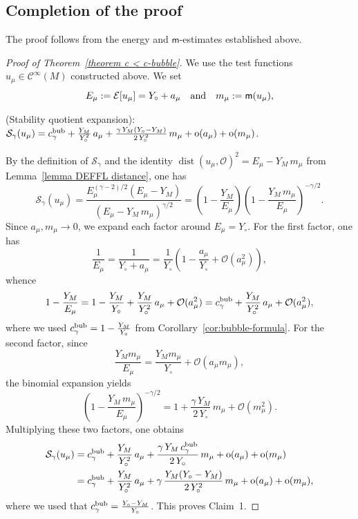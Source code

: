 \documentclass[reqno,11pt]{amsart}
\numberwithin{equation}{section}
\theoremstyle{definition}
\theoremstyle{remark}
\DeclareMathOperator{\dist}{dist}
\begin{document}
\subsection{Completion of the proof}

The proof follows from the energy and $\mathsf{m}$-estimates established above.

\begin{proof}[Proof of Theorem~\ref{theorem c < c-bubble}]
We use the test functions $u_\mu\in \mathcal{C}^\infty(M)$ constructed above. We set
\[
E_\mu := \mathcal{E}[u_\mu] = Y_\circ + a_\mu \quad {\rm and} \quad m_\mu := \mathsf{m}(u_\mu),
\]

\medskip
{} {\rm (Stability quotient expansion):} {\it $\mathcal{S}_\gamma(u_\mu) = c_\gamma^{\rm bub} + \frac{Y_M}{Y_\circ^2}\, a_\mu + \frac{\gamma\, Y_M(Y_\circ - Y_M)}{2\, Y_\circ^2}\, m_\mu + \mathrm{o}(a_\mu) + \mathrm{o}(m_\mu)$.}

\smallskip
{} By the definition of $\mathcal{S}_\gamma$ and the identity $\dist(u_\mu, \mathscr{O})^2 = E_\mu - Y_M\, m_\mu$ from Lemma~\ref{lemma DEFFL distance}, one has
\begin{equation}\label{eq:S-expansion}
\mathcal{S}_\gamma(u_\mu) = \frac{E_\mu^{(\gamma-2)/2}(E_\mu - Y_M)}{(E_\mu - Y_M\, m_\mu)^{\gamma/2}}
= \left(1 - \frac{Y_M}{E_\mu}\right)\left(1 - \frac{Y_M\, m_\mu}{E_\mu}\right)^{-\gamma/2}.
\end{equation}
Since $a_\mu, m_\mu \to 0$, we expand each factor around $E_\mu = Y_\circ$. For the first factor, one has
\[
\frac{1}{E_\mu} = \frac{1}{Y_\circ + a_\mu} = \frac{1}{Y_\circ}\left(1 - \frac{a_\mu}{Y_\circ} + \mathcal{O}(a_\mu^2)\right),
\]
whence
\[
1 - \frac{Y_M}{E_\mu} = 1 - \frac{Y_M}{Y_\circ} + \frac{Y_M}{Y_\circ^2}\, a_\mu + \mathcal{O}(a_\mu^2) = c_\gamma^{\rm bub} + \frac{Y_M}{Y_\circ^2}\, a_\mu + \mathcal{O}(a_\mu^2),
\]
where we used $c_\gamma^{\rm bub} = 1 - \tfrac{Y_M}{Y_\circ}$ from Corollary~\ref{cor:bubble-formula}. For the second factor, since 
\[
\frac{Y_M m_\mu}{E_\mu} = \frac{Y_M m_\mu}{Y_\circ} + \mathcal{O}(a_\mu m_\mu),
\]
the binomial expansion yields
\[
\left(1 - \frac{Y_M\, m_\mu}{E_\mu}\right)^{-\gamma/2} = 1 + \frac{\gamma\, Y_M}{2\, Y_\circ}\, m_\mu + \mathcal{O}(m_\mu^2).
\]
Multiplying these two factors, one obtains
\begin{equation}\label{eq:S-expansion-final}
\begin{aligned}
\mathcal{S}_\gamma(u_\mu) &= c_\gamma^{\rm bub} + \frac{Y_M}{Y_\circ^2}\, a_\mu + \frac{\gamma\, Y_M\, c_\gamma^{\rm bub}}{2\, Y_\circ}\, m_\mu + \mathrm{o}(a_\mu) + \mathrm{o}(m_\mu)\\
&= c_\gamma^{\rm bub} + \frac{Y_M}{Y_\circ^2}\, a_\mu + \gamma\, \frac{Y_M(Y_\circ - Y_M)}{2\, Y_\circ^2}\, m_\mu + \mathrm{o}(a_\mu) + \mathrm{o}(m_\mu), 
\end{aligned}
\end{equation}
where we used that $c_\gamma^{\rm bub} = \tfrac{Y_\circ - Y_M}{Y_\circ}$. This proves Claim~1.


\end{proof}
\end{document}
